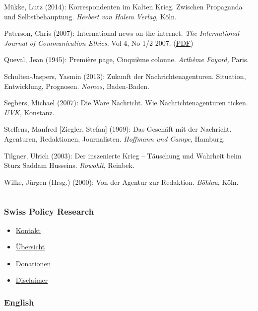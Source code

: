 Mükke, Lutz (2014): Korrespondenten im Kalten Krieg. Zwischen Propaganda
und Selbstbehauptung. \emph{Herbert von Halem Verlag,} Köln.

Paterson, Chris (2007): International news on the internet. \emph{The
International Journal of Communication Ethics.} Vol 4, No 1/2 2007.
(\href{http://www.communicationethics.net/journal/v4n1-2/v4n1-2_12.pdf}{PDF})

Queval, Jean (1945): Première page, Cinquième colonne. \emph{Arthème
Fayard,} Paris.

Schulten-Jaspers, Yasmin (2013): Zukunft der Nachrichtenagenturen.
Situation, Entwicklung, Prognosen. \emph{Nomos,} Baden-Baden.

Segbers, Michael (2007): Die Ware Nachricht. Wie Nachrichtenagenturen
ticken. \emph{UVK,} Konstanz.

Steffens, Manfred {[}Ziegler, Stefan{]} (1969): Das Geschäft mit der
Nachricht. Agenturen, Redaktionen, Journalisten. \emph{Hoffmann und
Campe}, Hamburg.

Tilgner, Ulrich (2003): Der inszenierte Krieg -- Täuschung und Wahrheit
beim Sturz Saddam Husseins. \emph{Rowohlt}, Reinbek.

Wilke, Jürgen (Hrsg.) (2000): Von der Agentur zur Redaktion.
\emph{Böhlau}, Köln.

\begin{center}\rule{0.5\linewidth}{\linethickness}\end{center}

\hypertarget{swiss-policy-research}{%
\subsubsection{Swiss Policy Research}\label{swiss-policy-research}}

\begin{itemize}
\tightlist
\item
  \href{https://swprs.org/kontakt/}{Kontakt}
\item
  \href{https://swprs.org/uebersicht/}{Übersicht}
\item
  \href{https://swprs.org/donationen/}{Donationen}
\item
  \href{https://swprs.org/disclaimer/}{Disclaimer}
\end{itemize}

\hypertarget{english}{%
\subsubsection{English}\label{english}}

